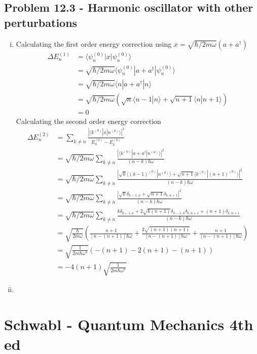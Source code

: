 \documentclass[../main.tex]{subfiles}
\begin{document}
\subsection{Problem 12.3 - Harmonic oscillator with other perturbations}
\begin{enumerate}[(i)]
\item Calculating the first order energy correction using $x=\sqrt{\hbar/2m\omega}(a+a^\dagger)$
\begin{align}
\Delta E^{(1)}_n
&=\langle\psi_n^{(0)}|x|\psi_n^{(0)}\rangle\\
&=\sqrt{\hbar/2m\omega}\langle\psi_n^{(0)}|a+a^\dagger|\psi_n^{(0)}\rangle\\
&=\sqrt{\hbar/2m\omega}\langle n|a+a^\dagger|n\rangle\\
&=\sqrt{\hbar/2m\omega}\left(\sqrt{n}\langle n-1|n\rangle+\sqrt{n+1}\langle n|n+1\rangle\right)\\
&=0
\end{align}
Calculating the second order energy correction
\begin{align}
\Delta E^{(2)}_n
&=\sum_{k\neq n}\frac{|\langle k^{(0)}|x|n^{(0)}\rangle|^2}{E^{(0)}_n-E^{(0)}_k} \\
&=\sqrt{\hbar/2m\omega}\sum_{k\neq n}\frac{|\langle k^{(0)}|a+a^\dagger|n^{(0)}\rangle|^2}{(n-k)\hbar\omega} \\
&=\sqrt{\hbar/2m\omega}\sum_{k\neq n}\frac{|\sqrt{k}\langle (k-1)^{(0)}|n^{(0)}\rangle+\sqrt{n+1}\langle k^{(0)}|(n+1)^{(0)}\rangle|^2}{(n-k)\hbar\omega} \\
&=\sqrt{\hbar/2m\omega}\sum_{k\neq n}\frac{|\sqrt{k}\delta_{k-1,n}+\sqrt{n+1}\delta_{k,n+1}|^2}{(n-k)\hbar\omega} \\
&=\sqrt{\hbar/2m\omega}\sum_{k\neq n}\frac{k\delta_{k-1,n}+2\sqrt{k(n+1)}\delta_{k-1,n}\delta_{k,n+1}+(n+1)\delta_{k,n+1}}{(n-k)\hbar\omega} \\
&=\sqrt{\frac{\hbar}{2m\omega}}\left(
\frac{n+1}{[n-(n+1)]\hbar\omega}
+\frac{2\sqrt{(n+1)(n+1)}}{[n-(n+1)]\hbar\omega}
+\frac{n+1}{[n-(n+1)]\hbar\omega}
\right)\\
&=\sqrt{\frac{1}{2m\hbar\omega^3}}\left(
-(n+1)
-2(n+1)
-(n+1)
\right)\\
&=-4(n+1)\sqrt{\frac{1}{2m\hbar\omega^3}}
\end{align}
\item
\end{enumerate}


\section{{\sc Schwabl} - Quantum Mechanics 4th ed}
\end{document}
